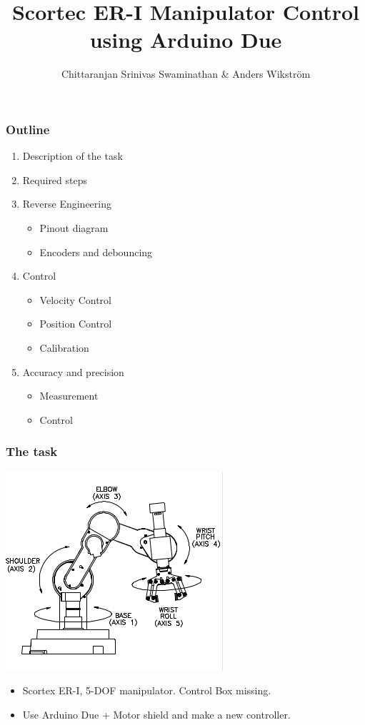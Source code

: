 \documentclass{beamer}
\title[Sensors Assignment 3]
{Scortec ER-I Manipulator Control using Arduino Due}
\author
{Chittaranjan Srinivas Swaminathan \& Anders Wikström}
\institute{Örebro University}
\begin{document}
\frame{\titlepage}
  \begin{frame}
    \frametitle{Outline}
    \begin{enumerate}
      \item Description of the task
      \item Required steps
      \item Reverse Engineering
        \begin{itemize}
          \item Pinout diagram
          \item Encoders and debouncing
        \end{itemize}
      \item Control
        \begin{itemize}
          \item Velocity Control
          \item Position Control
          \item Calibration
        \end{itemize}
      \item Accuracy and precision
        \begin{itemize}
          \item Measurement 
          \item Control
        \end{itemize}
    \end{enumerate}

  \end{frame}
  \begin{frame}
    \frametitle{The task}
    \centering
    \includegraphics[scale=0.75]{../Report/axes.png}
    \begin{itemize}
      \item<1-> Scortex ER-I, 5-DOF manipulator. Control Box missing.
      \item<2-> Use Arduino Due + Motor shield and make a new controller.
    \end{itemize}
  \end{frame}
\end{document}

